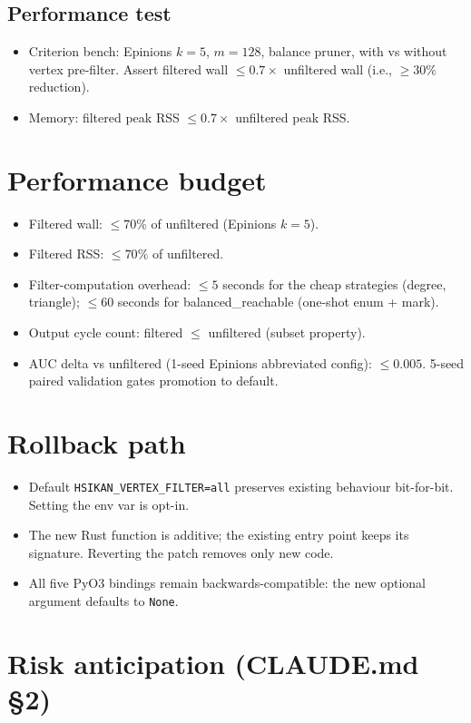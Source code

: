 \documentclass[11pt,a4paper]{article}
\begin{document}
\subsection*{Performance test}
\begin{itemize}
\item Criterion bench: Epinions $k{=}5$, $m{=}128$, balance pruner, with
  vs without vertex pre-filter.  Assert filtered wall $\leq 0.7\times$
  unfiltered wall (i.e., $\geq 30\%$ reduction).
\item Memory: filtered peak RSS $\leq 0.7\times$ unfiltered peak RSS.
\end{itemize}

\section{Performance budget}
\begin{itemize}
\item Filtered wall: $\leq 70\%$ of unfiltered (Epinions $k{=}5$).
\item Filtered RSS: $\leq 70\%$ of unfiltered.
\item Filter-computation overhead: $\leq 5$ seconds for the cheap
  strategies (degree, triangle); $\leq 60$ seconds for
  balanced\_reachable (one-shot enum + mark).
\item Output cycle count: filtered $\leq$ unfiltered (subset property).
\item AUC delta vs unfiltered (1-seed Epinions abbreviated config):
  $\leq 0.005$.  5-seed paired validation gates promotion to default.
\end{itemize}

\section{Rollback path}
\begin{itemize}
\item Default \texttt{HSIKAN\_VERTEX\_FILTER=all} preserves existing
  behaviour bit-for-bit.  Setting the env var is opt-in.
\item The new Rust function is additive; the existing entry point keeps
  its signature. Reverting the patch removes only new code.
\item All five PyO3 bindings remain backwards-compatible: the new
  optional argument defaults to \texttt{None}.
\end{itemize}

\section{Risk anticipation (CLAUDE.md \S2)}
\end{document}
